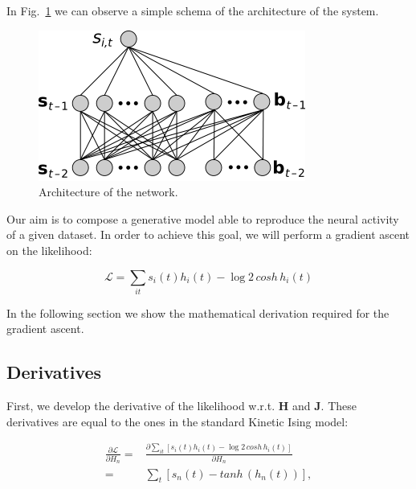 \documentclass{article}
\def\*#1{\mathbf{#1}}
\begin{document}
In Fig.~\ref{fig:net_arch} we can observe a simple schema of the architecture of the system.

\begin{figure}[ht]
    \centering
    \includegraphics[width=0.45\linewidth]{images/Hidden_Architecture.png}
    \caption{Architecture of the network.}
     \label{fig:net_arch}
\end{figure}

Our aim is to compose a generative model able to reproduce the neural activity of a given dataset. In order to achieve this goal, we will perform a gradient ascent on the likelihood:

\begin{equation}
   \mathcal{L} = \sum_{i t} s_{i}(t) h_{i}(t) - \log{ 2 \, cosh \, h_{i}(t)}
   \label{eq:likelihood}
\end{equation}

In the following section we show the mathematical derivation required for the gradient ascent.


\subsection{Derivatives}

First, we develop the derivative of the likelihood w.r.t. $\*H$ and $\*J$. These derivatives are equal to the ones in the standard Kinetic Ising model:

\begin{align}
    \frac{\partial\mathcal{L}}{\partial H_n} =& \frac{\partial \sum_{it} \left [ s_{i}(t) h_{i}(t) - \log{ 2 \, cosh \, h_{i}(t)} \right ]}{\partial H_n}
    \\ =&  \sum_{t} \left [ s_{n}(t) - tanh \,\left ( h_n(t) \right ) \right ],
\end{align}
\end{document}
